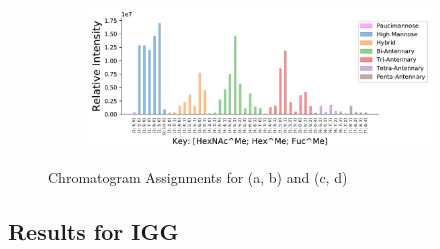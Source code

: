\begin{figure}[tb]
\begin{minipage}{1\linewidth}
\begin{subfigure}[b]{0.49\linewidth}
                \subcaption{
                    \label{fig:phil82_assignment:c}
                }
            \end{subfigure}
            \vspace{0pt}
            \begin{subfigure}[b]{0.49\linewidth}
                \includegraphics[width=1\linewidth, valign=b]{figure/dp_phil82_abundances.pdf}
                \subcaption{
                    \label{fig:phil82_assignment:d}
                }
            \end{subfigure}
        \end{minipage}
        \caption{Chromatogram Assignments for \phil (a, b) and \dpphil (c, d)
            \label{fig:phil82_assignments}
        }
    \end{figure}


\subsection{Results for IGG}
    
